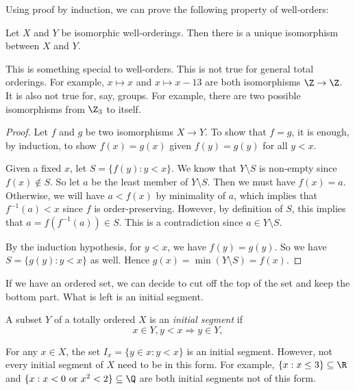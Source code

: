 \documentclass[a4paper]{article}
\begin{document}
Using proof by induction, we can prove the following property of well-orders:
\begin{prop}
  Let $X$ and $Y$ be isomorphic well-orderings. Then there is a unique isomorphism between $X$ and $Y$.
\end{prop}
This is something special to well-orders. This is not true for general total orderings. For example, $x\mapsto x$ and $x\mapsto x - 13$ are both isomorphisms $\Z\to \Z$. It is also not true for, say, groups. For example, there are two possible isomorphisms from $\Z_3$ to itself.

\begin{proof}
  Let $f$ and $g$ be two isomorphisms $X\to Y$. To show that $f = g$, it is enough, by induction, to show $f(x) = g(x)$ given $f(y) = g(y)$ for all $y < x$.

  Given a fixed $x$, let $S = \{f(y): y < x\}$. We know that $Y\setminus S$ is non-empty since $f(x) \not\in S$. So let $a$ be the least member of $Y\setminus S$. Then we must have $f(x) = a$. Otherwise, we will have $a < f(x)$ by minimality of $a$, which implies that $f^{-1}(a) < x$ since $f$ is order-preserving. However, by definition of $S$, this implies that $a = f(f^{-1}(a)) \in S$. This is a contradiction since $a \in Y\setminus S$.

  By the induction hypothesis, for $y < x$, we have $f(y) = g(y)$. So we have $S = \{g(y): y < x\}$ as well. Hence $g(x) = \min(Y\setminus S) = f(x)$.
\end{proof}

If we have an ordered set, we can decide to cut off the top of the set and keep the bottom part. What is left is an initial segment.
\begin{defi}
  A subset $Y$ of a totally ordered $X$ is an \emph{initial segment} if
  \[
    x\in Y, y< x \Rightarrow y\in Y,
  \]
  \begin{center}
  \end{center}
\end{defi}

\begin{eg}
  For any $x\in X$, the set $I_x = \{y\in x: y < x\}$ is an initial segment. However, not every initial segment of $X$ need to be in this form. For example, $\{x: x\leq 3\}\subseteq \R$ and $\{x: x < 0\text{ or }x^2 < 2\}\subseteq \Q$ are both initial segments not of this form.
\end{eg}
\end{document}
